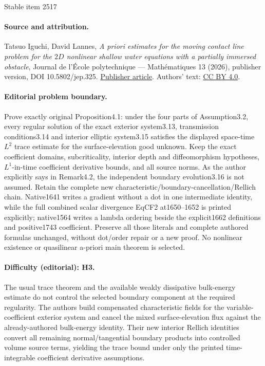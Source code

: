 \documentclass[11pt]{article}
\theoremstyle{definition}
\begin{document}
\begin{center}{\Large Stable item 2517}\end{center}
\paragraph{Source and attribution.}
Tatsuo Iguchi, David Lannes, \emph{A priori estimates for the moving contact line problem for the $2D$ nonlinear shallow water equations with a partially immersed obstacle}, Journal de l’École polytechnique — Mathématiques 13 (2026), publisher version, DOI 10.5802/jep.325. \href{https://jep.centre-mersenne.org/articles/10.5802/jep.325/}{Publisher article}. Authors' text: \href{https://creativecommons.org/licenses/by/4.0/}{CC BY 4.0}.
\paragraph{Editorial problem boundary.}
Prove exactly original Proposition4.1: under the four parts of Assumption3.2, every regular solution of the exact exterior system3.13, transmission conditions3.14 and interior elliptic system3.15 satisfies the displayed space-time $L^2$ trace estimate for the surface-elevation good unknown. Keep the exact coefficient domains, subcriticality, interior depth and diffeomorphism hypotheses, $L^1$-in-time coefficient derivative bounds, and all source norms. As the author explicitly says in Remark4.2, the independent boundary evolution3.16 is not assumed. Retain the complete new characteristic/boundary-cancellation/Rellich chain. Native1641 writes a gradient without a dot in one intermediate identity, while the full combined scalar divergence EqCF2 at1650--1652 is printed explicitly; native1564 writes a lambda ordering beside the explicit1662 definitions and positive1743 coefficient. Preserve all those literals and complete authored formulas unchanged, without dot/order repair or a new proof. No nonlinear existence or quasilinear a-priori main theorem is selected.
\paragraph{Difficulty (editorial): H3.}
The usual trace theorem and the available weakly dissipative bulk-energy estimate do not control the selected boundary component at the required regularity. The authors build compensated characteristic fields for the variable-coefficient exterior system and cancel the mixed surface-elevation flux against the already-authored bulk-energy identity. Their new interior Rellich identities convert all remaining normal/tangential boundary products into controlled volume source terms, yielding the trace bound under only the printed time-integrable coefficient derivative assumptions.
\end{document}
